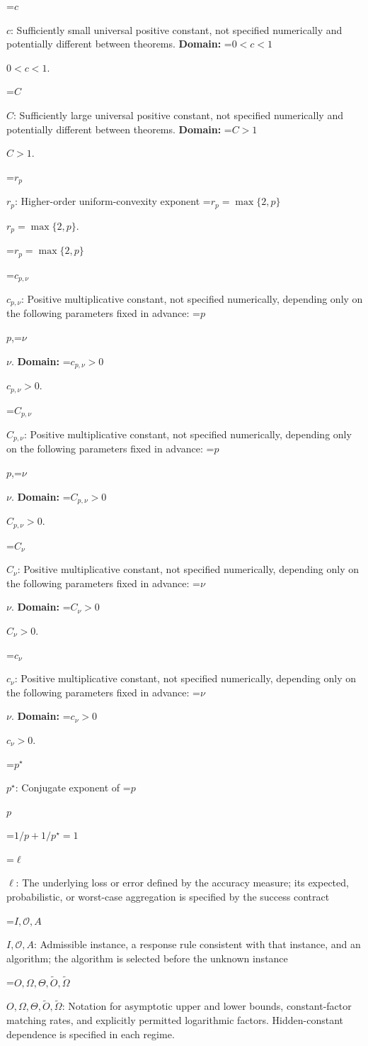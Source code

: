 \documentclass[10pt,a4paper]{article}
\newcommand{\AtlasMath}[1]{\par\begingroup\centering\setbox0=\hbox{$\displaystyle #1$}\ifdim\wd0>1.4\linewidth\typeout{ATLAS WIDE FORMULA: \the\wd0}\fi\ifdim\wd0>\linewidth\resizebox{\linewidth}{!}{\box0}\else\box0\fi\par\endgroup}
\newcommand{\AtlasInlineMath}[1]{\begingroup\setbox0=\hbox{$#1$}\ifdim\wd0>.4\linewidth\endgroup\AtlasMath{#1}\else\endgroup$#1$\fi}
\begin{document}
\AtlasInlineMath{c}: Sufficiently small universal positive constant, not specified numerically and potentially different between theorems. \textbf{Domain:} \AtlasInlineMath{0<c<1}.

\AtlasInlineMath{C}: Sufficiently large universal positive constant, not specified numerically and potentially different between theorems. \textbf{Domain:} \AtlasInlineMath{C>1}.

\AtlasInlineMath{r_p}: Higher-order uniform-convexity exponent \AtlasInlineMath{r_p=\max\{2,p\}}.


\AtlasMath{r_p=\max\{2,p\}}


\AtlasInlineMath{c_{p,\nu}}: Positive multiplicative constant, not specified numerically, depending only on the following parameters fixed in advance: \AtlasInlineMath{p},\AtlasInlineMath{\nu}. \textbf{Domain:} \AtlasInlineMath{c_{p,\nu}>0}.

\AtlasInlineMath{C_{p,\nu}}: Positive multiplicative constant, not specified numerically, depending only on the following parameters fixed in advance: \AtlasInlineMath{p},\AtlasInlineMath{\nu}. \textbf{Domain:} \AtlasInlineMath{C_{p,\nu}>0}.

\AtlasInlineMath{C_{\nu}}: Positive multiplicative constant, not specified numerically, depending only on the following parameters fixed in advance: \AtlasInlineMath{\nu}. \textbf{Domain:} \AtlasInlineMath{C_{\nu}>0}.

\AtlasInlineMath{c_{\nu}}: Positive multiplicative constant, not specified numerically, depending only on the following parameters fixed in advance: \AtlasInlineMath{\nu}. \textbf{Domain:} \AtlasInlineMath{c_{\nu}>0}.

\AtlasInlineMath{p^\star}: Conjugate exponent of \AtlasInlineMath{p}


\AtlasMath{1/p+1/p^\star=1}


\AtlasInlineMath{\ell}: The underlying loss or error defined by the accuracy measure; its expected, probabilistic, or worst-case aggregation is specified by the success contract

\AtlasInlineMath{I,\mathcal{O},A}: Admissible instance, a response rule consistent with that instance, and an algorithm; the algorithm is selected before the unknown instance

\AtlasInlineMath{O,\Omega,\Theta,\widetilde{O},\widetilde\Omega}: Notation for asymptotic upper and lower bounds, constant-factor matching rates, and explicitly permitted logarithmic factors. Hidden-constant dependence is specified in each regime.
\end{document}
